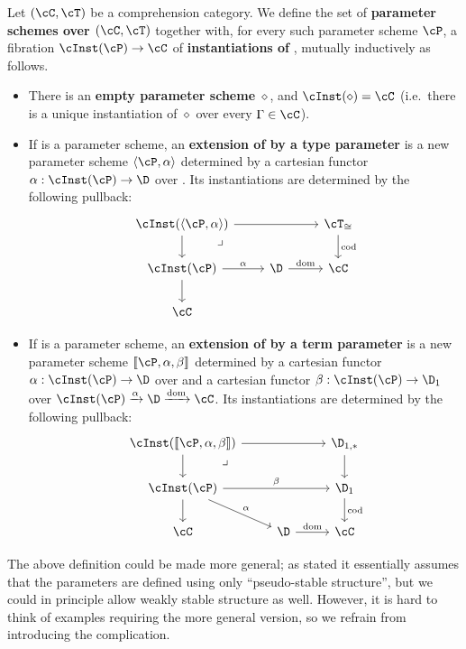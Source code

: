 \documentclass{amsart}
\let\P\cP
\def\emptyps{\diamond}
\def\typeps#1#2{\langle #1,#2\rangle}
\def\termps#1#2#3{\llbracket #1,#2,#3\rrbracket}
\let\C\cC
\let\T\cT
\def\pullback#1{\ar[#1,phantom,near start,"\lrcorner"]}
\begin{document}
\begin{defn}\label{defn:param-scheme}
  Let $(\C,\T)$ be a comprehension category.
  We define the set of \textbf{parameter schemes over $(\C,\T)$} together with, for every such parameter scheme $\P$, a fibration $\cInst(\P)\to\C$ of \textbf{instantiations of \P}, mutually inductively as follows.
  \begin{itemize}
  \item There is an \textbf{empty parameter scheme} $\emptyps$, and $\cInst(\emptyps) = \C$ (i.e.\ there is a unique instantiation of $\emptyps$ over every $\Gamma\in\C$).
  \item If \P is a parameter scheme, an \textbf{extension of \P by a type parameter} is a new parameter scheme $\typeps{\P}{\al}$ determined by a cartesian functor $\al:\cInst(\P)\to\D$ over \C.
    Its instantiations are determined by the following pullback:
    \[
    \begin{tikzcd}
      \cInst(\typeps{\P}{\al}) \ar[rr] \ar[d] \pullback{dr} && \T_{\cong} \ar[d,"\mathrm{cod}"] \\
      \cInst(\P) \ar[r,"\al"] \ar[d] & \D \ar[r,"\mathrm{dom}"] & \C\\
      \C
    \end{tikzcd}
    \]
  \item If \P is a parameter scheme, an \textbf{extension of \P by a term parameter} is a new parameter scheme $\termps\P\al\be$ determined by a cartesian functor $\al:\cInst(\P)\to\D$ over \C and a cartesian functor $\be:\cInst(\P) \to \D_1$ over $\cInst(\P) \xto{\al} \D \xto{\mathrm{dom}} \C$.
    Its instantiations are determined by the following pullback:
    \[
    \begin{tikzcd}
      \cInst(\termps{\P}{\al}{\be}) \ar[rr] \ar[d] \pullback{dr} & & \D_{1,*} \ar[d] \\
      \cInst(\P) \ar[dr,"\al"] \ar[d] \ar[rr,"\be"] & \phantom{.} & \D_1 \ar[d,"\mathrm{cod}"]\\
      \C & \D \ar[r,"\mathrm{dom}"] & \C
    \end{tikzcd}
    \]
  \end{itemize}
\end{defn}

\begin{rmk}{}
  The above definition could be made more general; as stated it essentially assumes that the parameters are defined using only ``pseudo-stable structure'', but we could in principle allow weakly stable structure as well.
  However, it is hard to think of examples requiring the more general version, so we refrain from introducing the complication.
\end{rmk}
\end{document}
